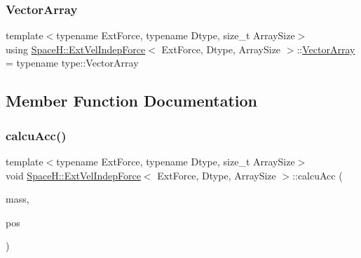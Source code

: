 \mbox{\label{struct_space_h_1_1_ext_vel_indep_force_ae9d2ecd856cbcfa1cc848003a8450adf}} 
\subsubsection{\texorpdfstring{Vector\+Array}{VectorArray}}
{\footnotesize\ttfamily template$<$typename Ext\+Force, typename Dtype, size\+\_\+t Array\+Size$>$ \\
using \mbox{\hyperlink{struct_space_h_1_1_ext_vel_indep_force}{Space\+H\+::\+Ext\+Vel\+Indep\+Force}}$<$ Ext\+Force, Dtype, Array\+Size $>$\+::\mbox{\hyperlink{struct_space_h_1_1_ext_vel_indep_force_ae9d2ecd856cbcfa1cc848003a8450adf}{Vector\+Array}} =  typename type\+::\+Vector\+Array}



\subsection{Member Function Documentation}
\mbox{\label{struct_space_h_1_1_ext_vel_indep_force_ade2a9eececdb0833213048c1e73c7756}} 
\subsubsection{\texorpdfstring{calcu\+Acc()}{calcuAcc()}}
{\footnotesize\ttfamily template$<$typename Ext\+Force, typename Dtype, size\+\_\+t Array\+Size$>$ \\
void \mbox{\hyperlink{struct_space_h_1_1_ext_vel_indep_force}{Space\+H\+::\+Ext\+Vel\+Indep\+Force}}$<$ Ext\+Force, Dtype, Array\+Size $>$\+::calcu\+Acc (\begin{DoxyParamCaption}\item[{const \mbox{\hyperlink{struct_space_h_1_1_ext_vel_indep_force_afe9c9f6c747f7b82f5e1058f5df2f2af}{Scalar\+Array}} \&}]{mass,  }\item[{const \mbox{\hyperlink{struct_space_h_1_1_ext_vel_indep_force_ae9d2ecd856cbcfa1cc848003a8450adf}{Vector\+Array}} \&}]{pos }\end{DoxyParamCaption})\hspace{0.3cm}{\ttfamily [inline]}}

